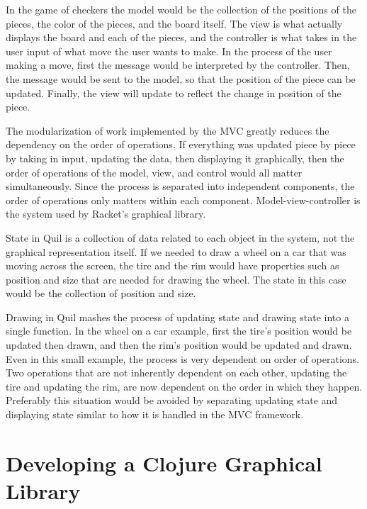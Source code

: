 \documentclass[12pt]{article}
\begin{document}
In the game of checkers the model would be the collection of the positions of the pieces, the color of the pieces, and the board itself. The view is what actually displays the board and each of the pieces, and the controller is what takes in the user input of what move the user wants to make. In the process of the user making a move, first the message would be interpreted by the controller. Then, the message would be sent to the model, so that the position of the piece can be updated. Finally, the view will update to reflect the change in position of the piece.

The modularization of work implemented by the MVC greatly reduces the dependency on the order of operations. If everything was updated piece by piece by taking in input, updating the data, then displaying it graphically, then the order of operations of the model, view, and control would all matter simultaneously. Since the process is separated into independent components, the order of operations only matters within each component. Model-view-controller is the system used by Racket's graphical library.

State in Quil is a collection of data related to each object in the system, not the graphical representation itself. If we needed to draw a wheel on a car that was moving across the screen, the tire and the rim would have properties such as position and size that are needed for drawing the wheel. The state in this case would be the collection of position and size.

Drawing in Quil mashes the process of updating state and drawing state into a single function. In the wheel on a car example, first the tire's position would be updated then drawn, and then the rim's position would be updated and drawn. Even in this small example, the process is very dependent on order of operations. Two operations that are not inherently dependent on each other, updating the tire and updating the rim, are now dependent on the order in which they happen. Preferably this situation would be avoided by separating updating state and displaying state similar to how it is handled in the MVC framework.

\section{Developing a Clojure Graphical Library}\label{sec:library}
\end{document}
